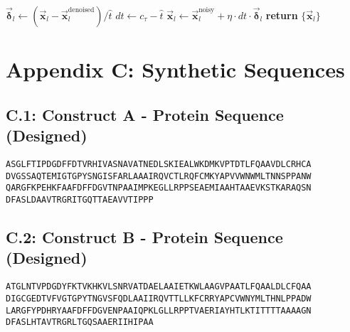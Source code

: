\begin{suppalgorithm}
{\begin{algorithmic}[1]
        
            \State $\vec{\boldsymbol{\delta}}_l \gets (\vec{\mathbf{x}}_l - \vec{\mathbf{x}}_l^{\text{denoised}})/\hat{t}$
            \State $dt \gets c_\tau - \hat{t}$
            \State $\vec{\mathbf{x}}_l \gets \vec{\mathbf{x}}_l^{\text{noisy}} + \eta \cdot dt \cdot \vec{\boldsymbol{\delta}}_l$
        \EndFor
        \State \textbf{return} $\{\vec{\mathbf{x}}_l\}$
        \end{algorithmic}
    }
    \label{alg:af3_sym}
\end{suppalgorithm}
\section*{Appendix C: Synthetic Sequences}\label{appendix:synthetic_seqs}
\subsection*{C.1: Construct A - Protein Sequence (Designed)}
\begin{verbatim}
ASGLFTIPDGDFFDTVRHIVASNAVATNEDLSKIEALWKDMKVPTDTLFQAAVDLCRHCA
DVGSSAQTEMIGTGPYSNGISFARLAAAIRQVCTLRQFCMKYAPVVWNWMLTNNSPPANW
QARGFKPEHKFAAFDFFDGVTNPAAIMPKEGLLRPPSEAEMIAAHTAAEVKSTKARAQSN
DFASLDAAVTRGRITGQTTAEAVVTIPPP
\end{verbatim}
\subsection*{C.2: Construct B - Protein Sequence (Designed)}
\begin{verbatim}
ATGLNTVPDGDYFKTVKHKVLSNRVATDAELAAIETKWLAAGVPAATLFQAALDLCFQAA
DIGCGEDTVFVGTGPYTNGVSFQDLAAIIRQVTTLLKFCRRYAPCVWNYMLTHNLPPADW
LARGFYPDHRYAAFDFFDGVENPAAIQPKLGLLRPPTVAERIAYHTLKTITTTTAAAAGN
DFASLHTAVTRGRLTGQSAAERIIHIPAA
\end{verbatim}
